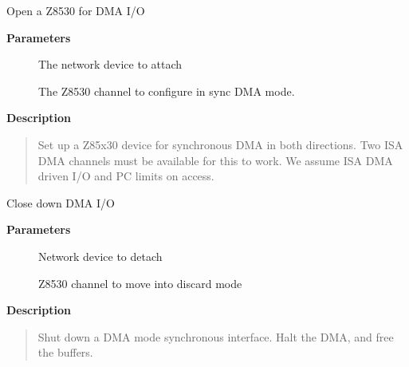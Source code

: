 \documentclass[a4paper,8pt,english]{sphinxmanual}
\begin{document}
\begin{fulllineitems}
\label{networking/z8530book:c.z8530_sync_dma_open}
Open a Z8530 for DMA I/O

\end{fulllineitems}


\textbf{Parameters}
\begin{description}
\item[{}] \leavevmode
The network device to attach

\item[{}] \leavevmode
The Z8530 channel to configure in sync DMA mode.

\end{description}

\textbf{Description}
\begin{quote}

Set up a Z85x30 device for synchronous DMA in both directions. Two
ISA DMA channels must be available for this to work. We assume ISA
DMA driven I/O and PC limits on access.
\end{quote}

\begin{fulllineitems}
\label{networking/z8530book:c.z8530_sync_dma_close}
Close down DMA I/O

\end{fulllineitems}


\textbf{Parameters}
\begin{description}
\item[{}] \leavevmode
Network device to detach

\item[{}] \leavevmode
Z8530 channel to move into discard mode

\end{description}

\textbf{Description}
\begin{quote}

Shut down a DMA mode synchronous interface. Halt the DMA, and
free the buffers.
\end{quote}
\end{document}
